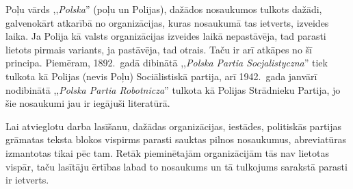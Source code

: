 \documentclass[twoside,a5paper,12pt,fleqn,openany]{extbook}
\newcommand{\pltxti}[1]{\textit{\textpolish{#1}}}
\begin{document}
Poļu vārds ,,\pltxti{Polska}'' (poļu un Polijas), dažādos nosaukumos tulkots dažādi, galvenokārt atkarībā no organizācijas, kuras nosaukumā tas ietverts, izveides laika.
Ja Polija kā valsts organizācijas izveides laikā nepastāvēja, tad parasti lietots pirmais variants, ja pastāvēja, tad otrais.
Taču ir arī atkāpes no šī principa.
Piemēram, 1892.~gadā dibinātā ,,\pltxti{Polska Partia Socjalistyczna}'' tiek tulkota kā Polijas (nevis Poļu) Sociālistiskā partija, arī 1942.~gada janvārī nodibinātā ,,\pltxti{Polska Partia Robotnicza}'' tulkota kā Polijas Strādnieku Partija, jo šie nosaukumi jau ir iegājuši literatūrā.

Lai atvieglotu darba lasīšanu, dažādas organizācijas, iestādes, politiskās partijas grāmatas teksta blokos vispirms parasti sauktas
pilnos nosaukumus, abreviatūras izmantotas tikai pēc tam.
Retāk pieminētajām organizācijām tās nav lietotas vispār, taču lasītāju ērtības labad to nosaukums un tā tulkojums sarakstā parasti ir ietverts.
\end{document}
